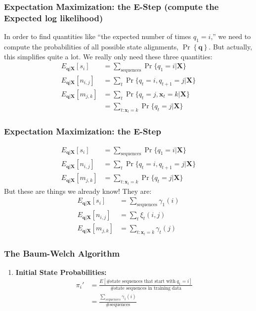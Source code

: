 \documentclass{beamer}
\begin{document}
\begin{frame}
  \frametitle{Expectation Maximization: the E-Step (compute the Expected log likelihood)}

  In order to find quantities like ``the expected number of times
  $q_1=i$,'' we need to compute the probabilities of all possible
  state alignments, $\Pr\left\{\mathbf{q}\right\}$.  But actually,
  this simplifies quite a lot.  We really only need these three
  quantities:
  \begin{align*}
    E_{\mathbf{q}|\mathbf{X}}\left[s_i\right] &= \sum_{\text{sequences}} \Pr\{q_1=i|\mathbf{X}\}\\
    E_{\mathbf{q}|\mathbf{X}}\left[n_{i,j}\right] &= \sum_t \Pr\{q_t=i,q_{t+1}=j|\mathbf{X}\}\\
    E_{\mathbf{q}|\mathbf{X}}\left[m_{j,k}\right] &= \sum_t \Pr\{q_{t}=j,\mathbf{x}_t=k|\mathbf{X}\}\\
    &= \sum_{t:\mathbf{x}_t=k} \Pr\{q_{t}=j|\mathbf{X}\}
  \end{align*}
\end{frame}

\begin{frame}
  \frametitle{Expectation Maximization: the E-Step}
  \begin{align*}
    E_{\mathbf{q}|\mathbf{X}}\left[s_i\right] &= \sum_{\text{sequences}} \Pr\{q_1=i|\mathbf{X}\}\\
    E_{\mathbf{q}|\mathbf{X}}\left[n_{i,j}\right] &= \sum_t \Pr\{q_t=i,q_{t+1}=j|\mathbf{X}\}\\
    E_{\mathbf{q}|\mathbf{X}}\left[m_{j,k}\right] 
    &= \sum_{t:\mathbf{x}_t=k} \Pr\{q_{t}=j|\mathbf{X}\}
  \end{align*}
  But these are things we already know!  They are:
  \begin{align*}
    E_{\mathbf{q}|\mathbf{X}}\left[s_i\right] &= \sum_{\text{sequences}} \gamma_1(i)\\
    E_{\mathbf{q}|\mathbf{X}}\left[n_{i,j}\right] &= \sum_t \xi_t(i,j)\\
    E_{\mathbf{q}|\mathbf{X}}\left[m_{j,k}\right] &= \sum_{t:\mathbf{x}_t=k} \gamma_t(j)
  \end{align*}
\end{frame}

\begin{frame}
  \frametitle{The Baum-Welch Algorithm}

  \begin{enumerate}
  \item {\bf Initial State Probabilities:}
    \begin{align*}
      \pi_i'&=\frac{E\left[\mbox{\# state sequences that start with}~q_1=i\right]}{\mbox{\# state sequences in training data}}\\
      &=\frac{\sum_{sequences} \gamma_1(i)}{\mbox{\# sequences}}
    \end{align*}
  \end{enumerate}
\end{frame}
\end{document}
